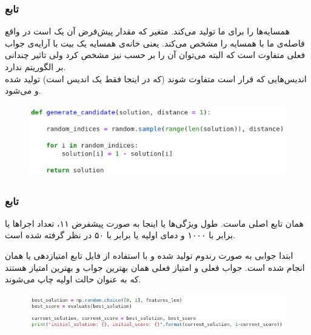 \documentclass{article}
\begin{document}
\begin{multicols}{2}
\subsubsection{
تابع
}
همسایه‌ها را برای ما تولید می‌کند. متغیر
که مقدار پیش‌فرض آن یک است در واقع فاصله‌ی ما با همسایه را مشخص می‌کند. یعنی خانه‌ی همسایه یک بیت با آرایه‌ی جواب فعلی متفاوت است که البته می‌توان آن را بر حسب
نیز مشخص کرد ولی تاثیر چندانی بر الگوریتم ندارد.\\
اندیس‌هایی که قرار است متفاوت شوند (که در اینجا فقط یک اندیس است) تولید شده و
می‌شود.
\begin{figure}[H]
    \centering
    \includegraphics[width=0.99\linewidth]{Photos/SA/gencandid.png}
    \caption{
    }
    \label{fig:my_label}
\end{figure}

\subsubsection{
تابع
}
همان تابع اصلی ماست. طول ویژگی‌ها یا
اینجا به صورت پیشفرض ۱۱، تعداد اجراها یا
برابر با ۱۰۰۰ و دمای اولیه یا
برابر با ۵۰ در نظر گرفته شده است.

ابتدا جوابی به صورت رندوم تولید شده و با استفاده از فایل
تابع امتیازدهی یا همان
انجام شده است. جواب فعلی و امتیاز فعلی همان بهترین جواب و بهترین امتیاز هستند که به عنوان حالت اولیه چاپ می‌شوند.
\begin{figure}[H]
    \centering
    \includegraphics[width=0.99\linewidth]{Photos/SA/randsol.png}
    \caption{
    }
    \label{fig:my_label}
\end{figure}


\end{multicols}
\end{document}
